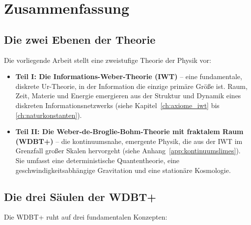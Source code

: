 
\chapter{Zusammenfassung}
\label{ch:zusammenfassung}

\section{Die zwei Ebenen der Theorie}
\label{sec:zwei_ebenen_zf}

Die vorliegende Arbeit stellt eine zweistufige Theorie der Physik vor:

\begin{itemize}
    \item \textbf{Teil I: Die Informations-Weber-Theorie (IWT)} – eine fundamentale, diskrete Ur-Theorie, in der Information die einzige primäre Größe ist. Raum, Zeit, Materie und Energie emergieren aus der Struktur und Dynamik eines diskreten Informationsnetzwerks (siehe Kapitel~\ref{ch:axiome_iwt} bis \ref{ch:naturkonstanten}).
    
    \item \textbf{Teil II: Die Weber-de-Broglie-Bohm-Theorie mit fraktalem Raum (WDBT+)} – die kontinuumsnahe, emergente Physik, die aus der IWT im Grenzfall großer Skalen hervorgeht (siehe Anhang~\ref{app:kontinuumslimes}). Sie umfasst eine deterministische Quantentheorie, eine geschwindigkeitsabhängige Gravitation und eine stationäre Kosmologie.
\end{itemize}

\section{Die drei Säulen der WDBT+}
\label{sec:drei_saeulen_zf}

Die WDBT+ ruht auf drei fundamentalen Konzepten:

